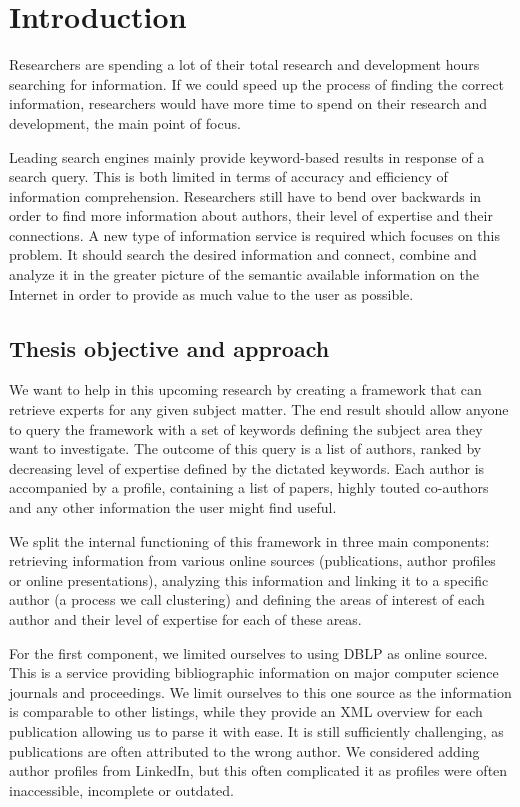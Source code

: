 \chapter{Introduction}

Researchers are spending a lot of their total research and development hours searching for information. If we could speed up the process of finding the correct information, researchers would have more time to spend on their research and development, the main point of focus.

Leading search engines mainly provide keyword-based results in response of a search query. This is both limited in terms of accuracy and efficiency of information comprehension. Researchers still have to bend over backwards in order to find more information about authors, their level of expertise and their connections. A new type of information service is required which focuses on this problem. It should search the desired information and connect, combine and analyze it in the greater picture of the semantic available information on the Internet in order to provide as much value to the user as possible.


\section{Thesis objective and approach}

We want to help in this upcoming research by creating a framework that can retrieve experts for any given subject matter. The end result should allow anyone to query the framework with a set of keywords defining the subject area they want to investigate. The outcome of this query is a list of authors, ranked by decreasing level of expertise defined by the dictated keywords. Each author is accompanied by a profile, containing a list of papers, highly touted co-authors and any other information the user might find useful.

We split the internal functioning of this framework in three main components: retrieving information from various online sources (publications, author profiles or online presentations), analyzing this information and linking it to a specific author (a process we call clustering) and defining the areas of interest of each author and their level of expertise for each of these areas.

For the first component, we limited ourselves to using DBLP \cite{dblp} as online source. This is a service providing bibliographic information on major computer science journals and proceedings. We limit ourselves to this one source as the information is comparable to other listings, while they provide an XML overview for each publication allowing us to parse it with ease. It is still sufficiently challenging, as publications are often attributed to the wrong author. We considered adding author profiles from LinkedIn, but this often complicated it as profiles were often inaccessible, incomplete or outdated.

